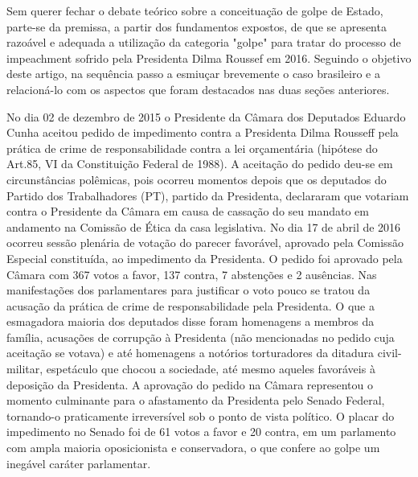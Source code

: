 Sem querer fechar o debate teórico sobre a conceituação de golpe de
Estado, parte-se da premissa, a partir dos fundamentos expostos, de que
se apresenta razoável e adequada a utilização da categoria "golpe" para
tratar do processo de impeachment sofrido pela Presidenta Dilma Roussef
em 2016. Seguindo o objetivo deste artigo, na sequência passo a esmiuçar
brevemente o caso brasileiro e a relacioná-lo com os aspectos que foram
destacados nas duas seções anteriores.

No dia 02 de dezembro de 2015 o Presidente da Câmara dos Deputados
Eduardo Cunha aceitou pedido de impedimento contra a Presidenta Dilma
Rousseff pela prática de crime de responsabilidade contra a lei
orçamentária (hipótese do Art.85, VI da Constituição Federal de 1988). A
aceitação do pedido deu-se em circunstâncias polêmicas, pois ocorreu
momentos depois que os deputados do Partido dos Trabalhadores (PT),
partido da Presidenta, declararam que votariam contra o Presidente da
Câmara em causa de cassação do seu mandato em andamento na Comissão de
Ética da casa legislativa. No dia 17 de abril de 2016 ocorreu sessão
plenária de votação do parecer favorável, aprovado pela Comissão
Especial constituída, ao impedimento da Presidenta. O pedido foi
aprovado pela Câmara com 367 votos a favor, 137 contra, 7 abstenções e 2
ausências. Nas manifestações dos parlamentares para justificar o voto
pouco se tratou da acusação da prática de crime de responsabilidade pela
Presidenta. O que a esmagadora maioria dos deputados disse foram
homenagens a membros da família, acusações de corrupção à Presidenta
(não mencionadas no pedido cuja aceitação se votava) e até homenagens a
notórios torturadores da ditadura civil-militar, espetáculo que chocou a
sociedade, até mesmo aqueles favoráveis à deposição da Presidenta. A
aprovação do pedido na Câmara representou o momento culminante para o
afastamento da Presidenta pelo Senado Federal, tornando-o praticamente
irreversível sob o ponto de vista político. O placar do impedimento no
Senado foi de 61 votos a favor e 20 contra, em um parlamento com ampla
maioria oposicionista e conservadora, o que confere ao golpe um inegável
caráter parlamentar.


